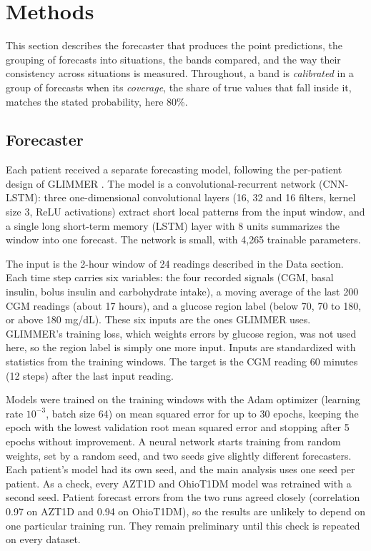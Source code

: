 \section{Methods}
\label{sec:methods}

This section describes the forecaster that produces the point predictions, the grouping of forecasts into situations, the bands compared, and the way their consistency across situations is measured. Throughout, a band is \emph{calibrated} in a group of forecasts when its \emph{coverage}, the share of true values that fall inside it, matches the stated probability, here 80\%.

\subsection{Forecaster}
\label{sec:forecaster}

Each patient received a separate forecasting model, following the per-patient design of GLIMMER \parencite{glimmer2026}. The model is a convolutional-recurrent network (CNN-LSTM): three one-dimensional convolutional layers (16, 32 and 16 filters, kernel size 3, ReLU activations) extract short local patterns from the input window, and a single long short-term memory (LSTM) layer with 8 units summarizes the window into one forecast. The network is small, with 4,265 trainable parameters.

The input is the 2-hour window of 24 readings described in the Data section. Each time step carries six variables: the four recorded signals (CGM, basal insulin, bolus insulin and carbohydrate intake), a moving average of the last 200 CGM readings (about 17 hours), and a glucose region label (below 70, 70 to 180, or above 180 mg/dL). These six inputs are the ones GLIMMER uses. GLIMMER's training loss, which weights errors by glucose region, was not used here, so the region label is simply one more input. Inputs are standardized with statistics from the training windows. The target is the CGM reading 60 minutes (12 steps) after the last input reading.

Models were trained on the training windows with the Adam optimizer (learning rate $10^{-3}$, batch size 64) on mean squared error for up to 30 epochs, keeping the epoch with the lowest validation root mean squared error and stopping after 5 epochs without improvement. A neural network starts training from random weights, set by a random seed, and two seeds give slightly different forecasters. Each patient's model had its own seed, and the main analysis uses one seed per patient. As a check, every AZT1D and OhioT1DM model was retrained with a second seed. Patient forecast errors from the two runs agreed closely (correlation 0.97 on AZT1D and 0.94 on OhioT1DM), so the results are unlikely to depend on one particular training run. They remain preliminary until this check is repeated on every dataset.

